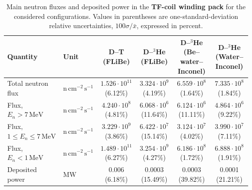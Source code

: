 

\begin{table}[!h]
\centering
\caption{Main neutron fluxes and deposited power in the \textbf{TF-coil winding pack} for the considered configurations. Values in parentheses are one-standard-deviation relative uncertainties,
$100\sigma/\bar{x}$, expressed in percent.}
\label{tab:windingpack}

\begin{tabular}{@{}llcccc@{}}
\toprule
Quantity
& Unit
& \makecell{D--T\\(FLiBe)}
& \makecell{D--$^3$He\\(FLiBe)}
& \makecell{D--$^3$He\\(Be--water--\\Inconel)}
& \makecell{D--$^3$He\\(Water--\\Inconel)}
\\
\midrule

Total neutron flux
& $\mathrm{n\,cm^{-2}\,s^{-1}}$
& $1.526\cdot 10^{11}$ (6.12\%)
& $3.324\cdot 10^{9}$ (4.19\%)
& $6.559\cdot 10^{8}$ (1.64\%)
& $7.335\cdot 10^{8}$ (1.84\%)
\\

Flux, $E_n>7\,\mathrm{MeV}$
& $\mathrm{n\,cm^{-2}\,s^{-1}}$
& $4.240\cdot 10^{8}$ (4.81\%)
& $6.068\cdot 10^{6}$ (11.64\%)
& $6.124\cdot 10^{6}$ (11.11\%)
& $4.864\cdot 10^{6}$ (9.22\%)
\\

Flux, $1\leq E_n\leq7\,\mathrm{MeV}$
& $\mathrm{n\,cm^{-2}\,s^{-1}}$
& $3.229\cdot 10^{9}$ (3.86\%)
& $6.422\cdot 10^{7}$ (15.14\%)
& $3.124\cdot 10^{7}$ (4.02\%)
& $3.990\cdot 10^{7}$ (7.11\%)
\\

Flux, $E_n<1\,\mathrm{MeV}$
& $\mathrm{n\,cm^{-2}\,s^{-1}}$
& $1.489\cdot 10^{11}$ (6.27\%)
& $3.254\cdot 10^{9}$ (4.27\%)
& $6.186\cdot 10^{8}$ (1.72\%)
& $6.888\cdot 10^{8}$ (1.91\%)
\\

\midrule
Deposited power
& $\mathrm{MW}$
& 0.006 (6.18\%)
& 0.0003 (15.49\%)
& 0.0003 (39.82\%)
& 0.0001 (21.21\%)
\\

\bottomrule
\end{tabular}
\end{table}


